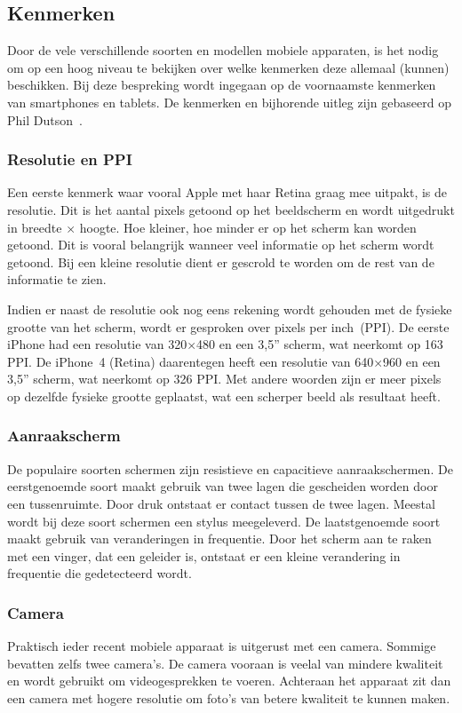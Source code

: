 \subsection{Kenmerken}
Door de vele verschillende soorten en modellen mobiele apparaten, is het nodig om op een hoog niveau te bekijken over welke kenmerken deze allemaal (kunnen) beschikken. 
Bij deze bespreking wordt ingegaan op de voornaamste kenmerken van smartphones en tablets. 
De kenmerken en bijhorende uitleg zijn gebaseerd op Phil Dutson~\cite{PhilDutson2012}.

\subsubsection{Resolutie en PPI}
Een eerste kenmerk waar vooral Apple met haar Retina graag mee uitpakt, is de resolutie. 
Dit is het aantal pixels getoond op het beeldscherm en wordt uitgedrukt in breedte $\times$ hoogte. 
Hoe kleiner, hoe minder er op het scherm kan worden getoond. 
Dit is vooral belangrijk wanneer veel informatie op het scherm wordt getoond. 
Bij een kleine resolutie dient er gescrold te worden om de rest van de informatie te zien.

Indien er naast de resolutie ook nog eens rekening wordt gehouden met de fysieke grootte van het scherm, wordt er gesproken over pixels per inch~(PPI). 
De eerste iPhone had een resolutie van 320$\times$480 en een 3,5” scherm, wat neerkomt op 163 PPI. 
De iPhone~4 (Retina) daarentegen heeft een resolutie van 640$\times$960 en een 3,5” scherm, wat neerkomt op 326 PPI. 
Met andere woorden zijn er meer pixels op dezelfde fysieke grootte geplaatst, wat een scherper beeld als resultaat heeft. 

\subsubsection{Aanraakscherm}
De populaire soorten schermen zijn resistieve en capacitieve aanraakschermen. 
De eerstgenoemde soort maakt gebruik van twee lagen die gescheiden worden door een tussenruimte. 
Door druk ontstaat er contact tussen de twee lagen. 
Meestal wordt bij deze soort schermen een stylus meegeleverd. 
De laatstgenoemde soort maakt gebruik van veranderingen in frequentie. 
Door het scherm aan te raken met een vinger, dat een geleider is, ontstaat er een kleine verandering in frequentie die gedetecteerd wordt. 

\subsubsection{Camera}
Praktisch ieder recent mobiele apparaat is uitgerust met een camera. 
Sommige bevatten zelfs twee camera's. 
De camera vooraan is veelal van mindere kwaliteit en wordt gebruikt om videogesprekken te voeren. 
Achteraan het apparaat zit dan een camera met hogere resolutie om foto's van betere kwaliteit te kunnen maken.

